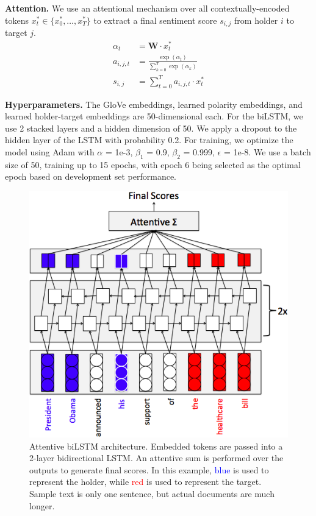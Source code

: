 \documentclass[11pt,a4paper]{article}
\begin{document}
\noindent\textbf{Attention.}
We use an attentional mechanism over all contextually-encoded tokens $x_t^*\in \{x_0^*, \dots, x_T^*\}$ to extract a final sentiment score $s_{i, j}$ from holder $i$ to target $j$.
\begin{align*}
\alpha_{t} & = \textbf{W} \cdot x^*_t \\
a_{i, j, t} & = \frac{\exp{(\alpha_t)}}{\sum^{T}_{k=0} \exp{(\alpha_k)}} \\
s_{i, j} & = \sum^{T}_{t = 0} a_{i, j, t}\cdot x_t^*
\end{align*}

\noindent\textbf{Hyperparameters.}
The GloVe embeddings, learned polarity embeddings, and learned holder-target embeddings are 50-dimensional each.
For the biLSTM, we use 2 stacked layers and a hidden dimension of 50. We apply a dropout to the hidden layer of the LSTM with probability 0.2.
For training, we optimize the model using Adam with $\alpha$ = 1e-3, $\beta_1$ = 0.9, $\beta_2$ = 0.999, $\epsilon$ = 1e-8. We use a batch size of 50, training up to 15 epochs, with epoch 6 being selected as the optimal epoch based on development set performance.

\begin{figure} \label{fig:intro}
\centering
\includegraphics[scale=0.4]{base.png}
\caption{Attentive biLSTM architecture. Embedded tokens are passed into a 2-layer bidirectional LSTM. An attentive sum is performed over the outputs to generate final scores. In this example, \textcolor{blue}{blue} is used to represent the holder, while \textcolor{red}{red} is used to represent the target. Sample text is only one sentence, but actual documents are much longer.}
\end{figure}
\end{document}
